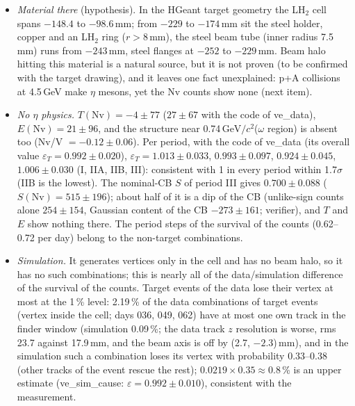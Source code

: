 \documentclass[11pt,a4paper]{article}
\newcommand{\GeVcc}{\ensuremath{\mathrm{GeV}/c^{2}}\xspace}
\begin{document}
\begin{itemize}
      outside the window by construction, so the position alone is not independent evidence. Not forced by the selection is that the median track
      $z$ of Nv stays at $-214$ to $-197$\,mm at all polar angles; a timing or reconstruction distortion would change with the angle.
\item \emph{Material there} (hypothesis). In the HGeant target geometry the LH$_2$ cell spans $-148.4$ to $-98.6$\,mm; from $-229$ to $-174$\,mm
      sit the steel holder, copper and an LH$_2$ ring ($r>8$\,mm), the steel beam tube (inner radius 7.5\,mm) runs from $-243$\,mm, steel flanges
      at $-252$ to $-229$\,mm. Beam halo hitting this material is a natural source, but it is not proven (to be confirmed with the target
      drawing), and it leaves one fact unexplained: p+A collisions at 4.5\,GeV make $\eta$ mesons, yet the Nv counts show none (next item).
\item \emph{No $\eta$ physics.} $T(\mathrm{Nv})=-4\pm77$ ($27\pm67$ with the code of ve\_data), $E(\mathrm{Nv})=21\pm96$, and the structure
      near 0.74\,\GeVcc ($\omega$ region) is absent too (Nv/V $=-0.12\pm0.06$). Per period, with the code of ve\_data (its overall value
      $\varepsilon_T=0.992\pm0.020$), $\varepsilon_T=1.013\pm0.033$, $0.993\pm0.097$, $0.924\pm0.045$, $1.006\pm0.030$ (I, IIA, IIB, III): consistent
      with 1 in every period within 1.7$\sigma$ (IIB is the lowest). The nominal-CB $S$ of period III gives $0.700\pm0.088$ ($S(\mathrm{Nv})=515\pm196$);
      about half of it is a dip of the CB (unlike-sign counts alone $254\pm154$, Gaussian content of the CB $-273\pm161$; verifier), and $T$ and $E$
      show nothing there. The period steps of the survival of the counts (0.62--0.72 per day) belong to the non-target combinations.
\item \emph{Simulation.} It generates vertices only in the cell and has no beam halo, so it has no such combinations; this is nearly all of the
      data/simulation difference of the survival of the counts. Target events of the data lose their vertex at most at the 1\,\% level: 2.19\,\% of the data
      combinations of target events (vertex inside the cell; days 036, 049, 062) have at most one own track in the finder window (simulation 0.09\,\%;
      the data track $z$ resolution is worse, rms 23.7 against 17.9\,mm, and the beam axis is off by (2.7, $-2.3$)\,mm), and in the simulation such
      a combination loses its vertex with probability 0.33--0.38 (other tracks of the event rescue the rest); $0.0219\times0.35\approx0.8$\,\% is an upper
      estimate (ve\_sim\_cause: $\varepsilon=0.992\pm0.010$), consistent with the measurement.
\end{itemize}
\end{document}
